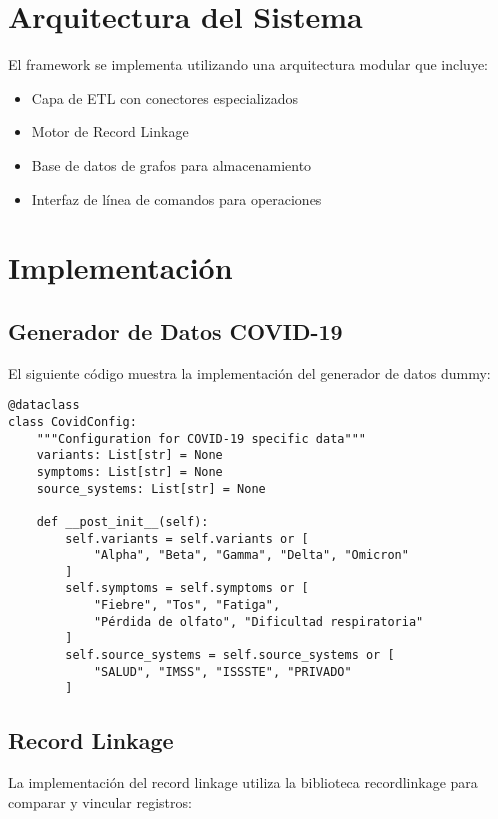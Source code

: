 \documentclass[12pt]{article}
\begin{document}
\section{Arquitectura del Sistema}
El framework se implementa utilizando una arquitectura modular que incluye:

\begin{itemize}
    \item Capa de ETL con conectores especializados
    \item Motor de Record Linkage
    \item Base de datos de grafos para almacenamiento
    \item Interfaz de línea de comandos para operaciones
\end{itemize}

\section{Implementación}

\subsection{Generador de Datos COVID-19}
El siguiente código muestra la implementación del generador de datos dummy:

\begin{lstlisting}[caption=Implementación del Generador de Datos COVID-19]
@dataclass
class CovidConfig:
    """Configuration for COVID-19 specific data"""
    variants: List[str] = None
    symptoms: List[str] = None
    source_systems: List[str] = None

    def __post_init__(self):
        self.variants = self.variants or [
            "Alpha", "Beta", "Gamma", "Delta", "Omicron"
        ]
        self.symptoms = self.symptoms or [
            "Fiebre", "Tos", "Fatiga", 
            "Pérdida de olfato", "Dificultad respiratoria"
        ]
        self.source_systems = self.source_systems or [
            "SALUD", "IMSS", "ISSSTE", "PRIVADO"
        ]
\end{lstlisting}

\subsection{Record Linkage}
La implementación del record linkage utiliza la biblioteca recordlinkage para 
comparar y vincular registros:
\end{document}
